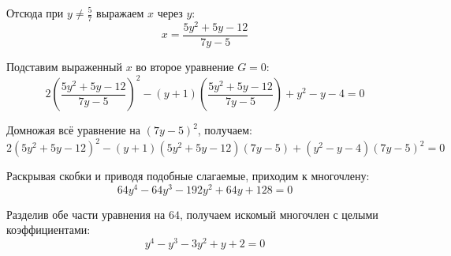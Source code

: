 \documentclass[12pt]{article}
\begin{document}
	Отсюда при $y \neq \frac{5}{7}$ выражаем $x$ через $y$:
	\[
		x = \frac{5y^2 + 5y - 12}{7y - 5}
	\]
	
	Подставим выраженный $x$ во второе уравнение $G = 0$:
	\[
		2 \left( \frac{5y^2 + 5y - 12}{7y - 5} \right)^2 - (y + 1) \left( \frac{5y^2 + 5y - 12}{7y - 5} \right) + y^2 - y - 4 = 0
	\]
	
	Домножая всё уравнение на $(7y - 5)^2$, получаем:
	\[
		2(5y^2 + 5y - 12)^2 - (y + 1)(5y^2 + 5y - 12)(7y - 5) + (y^2 - y - 4)(7y - 5)^2 = 0
	\]
	
	Раскрывая скобки и приводя подобные слагаемые, приходим к многочлену:
	\[
		64y^4 - 64y^3 - 192y^2 + 64y + 128 = 0
	\]
	
	Разделив обе части уравнения на $64$, получаем искомый многочлен с целыми коэффициентами:
	\[
		\boxed{y^4 - y^3 - 3y^2 + y + 2 = 0}
	\]
	
\end{document}
